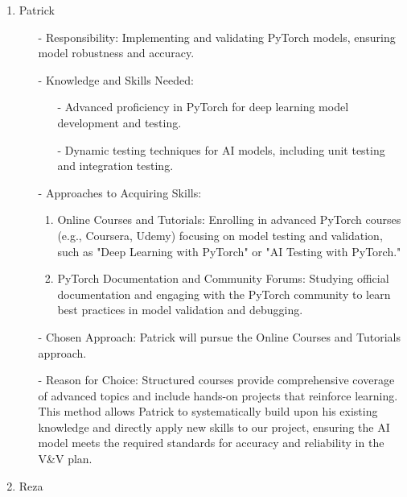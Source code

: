 \documentclass[12pt, titlepage]{article}
\begin{document}
\begin{enumerate}
  \item Patrick

  \begin{itemize}
      \item[-]Responsibility: Implementing and validating PyTorch models, ensuring model robustness and accuracy.
      \item[-] Knowledge and Skills Needed:
      \begin{itemize}
          \item[-] Advanced proficiency in PyTorch for deep learning model development and testing.
          \item[-] Dynamic testing techniques for AI models, including unit testing and integration testing.
      \end{itemize}
      \item[-] Approaches to Acquiring Skills:
      \begin{enumerate}
          \item Online Courses and Tutorials: Enrolling in advanced PyTorch courses (e.g., Coursera, Udemy) focusing on model testing and validation, such as "Deep Learning with PyTorch" or "AI Testing with PyTorch."
          \item PyTorch Documentation and Community Forums: Studying official documentation and engaging with the PyTorch community to learn best practices in model validation and debugging.
      \end{enumerate}
      \item[-] Chosen Approach: Patrick will pursue the Online Courses and Tutorials approach.
      \item[-] Reason for Choice: Structured courses provide comprehensive coverage of advanced topics and include hands-on projects that reinforce learning. This method allows Patrick to systematically build upon his existing knowledge and directly apply new skills to our project, ensuring the AI model meets the required standards for accuracy and reliability in the V\&V plan.
  \end{itemize}

  \item Reza


\end{enumerate}
\end{document}
